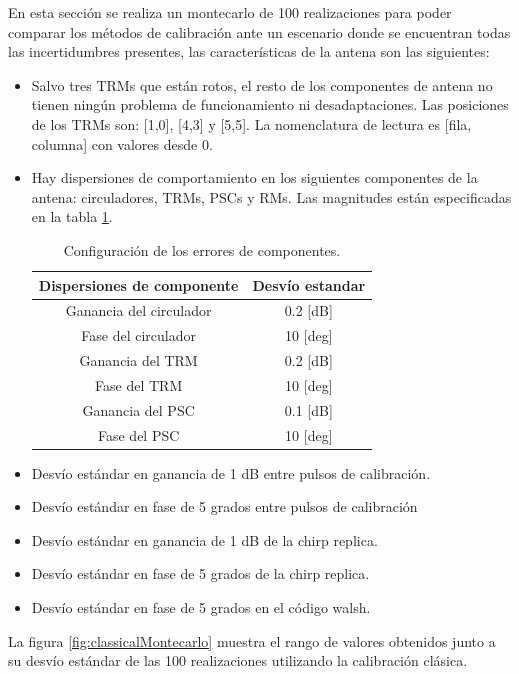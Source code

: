 En esta sección se realiza un montecarlo de 100 realizaciones para poder comparar los métodos de calibración ante un 
escenario donde se encuentran todas las incertidumbres presentes, las características de la antena son las siguientes:
\begin{itemize}
	\item Salvo tres TRMs que están rotos, el resto de los componentes de antena no tienen ningún problema de funcionamiento ni 
		desadaptaciones. Las posiciones de los TRMs son: [1,0], [4,3] y [5,5]. La nomenclatura de lectura es [fila, columna] con 
		valores desde 0.
	\item Hay dispersiones de comportamiento en los siguientes componentes de la antena: circuladores, TRMs, PSCs y RMs. Las 
		magnitudes están especificadas en la tabla \ref{tab:errorReferences2}.
		\begin{table}[H]
		  \footnotesize
		  \centering
		  \begin{tabular}{|c|c|}
			\hline
			\textbf{Dispersiones de componente} & \textbf{Desvío estandar} \tabularnewline \hline 
			Ganancia del circulador &  0.2 [dB] \tabularnewline\hline 
			Fase del circulador &  10 [deg] \tabularnewline\hline 
			Ganancia del TRM &  0.2 [dB] \tabularnewline\hline 
			Fase del TRM &  10 [deg] \tabularnewline\hline 
			Ganancia del PSC &  0.1 [dB] \tabularnewline\hline 
			Fase del PSC &  10 [deg] \tabularnewline\hline 
		  \end{tabular}
		  \caption{Configuración de los errores de componentes.}
		  \label{tab:errorReferences2}
		\end{table}
	\item Desvío estándar en ganancia de 1 dB entre pulsos de calibración.
	\item Desvío estándar en fase de 5 grados entre pulsos de calibración
	\item Desvío estándar en ganancia de 1 dB de la chirp replica.
	\item Desvío estándar en fase de 5 grados de la chirp replica.
	\item Desvío estándar en fase de 5 grados en el código walsh.
\end{itemize}

La figura \ref{fig:classicalMontecarlo} muestra el rango de valores obtenidos junto a su desvío estándar de las 100 
realizaciones utilizando la calibración clásica.

